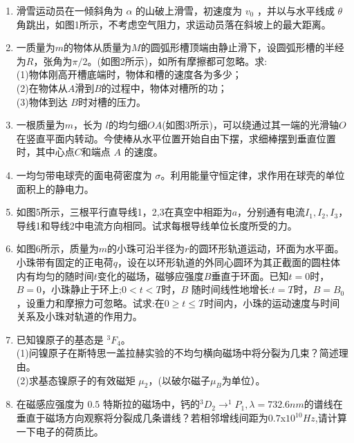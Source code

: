\begin{enumerate}
\item 滑雪运动员在一倾斜角为 $\alpha$ 的山破上滑雪，初速度为 $v_0$ ，并以与水平线成 $\theta$ 角跳出，如图1所示，不考虑空气阻力，求运动员落在斜坡上的最大距离。
\item 一质量为$m$的物体从质量为$M$的圆弧形槽顶端由静止滑下，设圆弧形槽的半经为$R$，张角为$\pi /2$。(如图2所示)，如所有摩擦都可忽略。求:\\
(1)物体刚高开槽底端时，物体和槽的速度各为多少；\\
(2)在物体从$A$滑到$B$的过程中，物体对槽所的功；\\
(3)物体到达 $B $时对槽的压力。
\item 一根质量为$m$，长为  $l$的均匀细$OA$(如图3所示)，可以绕通过其一端的光滑轴$O$在竖直平面内转动。今使棒从水平位置开始自由下摆，求细棒摆到垂直位置时，其中心点$C$和端点 $A$ 的速度。
\item 一均匀带电球壳的面电荷密度为 $\sigma$。利用能量守恒定律，求作用在球壳的单位面积上的静电力。
\item 如图5所示，三根平行直导线1，2,3在真空中相距为$a$，分别通有电流$I_1,I_2,I_3$，导线1和导线2中电流方向相同。试求每根导线单位长度所受的力。
\item 如图6所示，质量为$m$的小珠可沿半径为$r$的圆环形轨道运动，环面为水平面。小珠带有固定的正电荷$q$，设在以环形轨道的外同心圆环为其正截面的圆柱体内有均匀的随时间$t$变化的磁场，磁够应强度$B$垂直于环面。已知$t=0$时，$B=0$，小珠静止于环上;$0<t<T$时，$B$ 随时间线性地增长:$t=T$时，$B=B_0$，设重力和摩擦力可忽略。试求:在$0\ge t \le T$时间内，小珠的运动速度与时间关系及小珠对轨道的作用力。
\item 已知镍原子的基态是 $ ^{3}F_4$。\\
(1)问镍原子在斯特思一盖拉赫实验的不均匀横向磁场中将分裂为几束？简述理由。\\
(2)求基态镍原子的有效磁矩 $\mu_2$，(以破尔磁子$\mu_B$为单位）。
\item 在磁感应强度为 $0.5$ 特斯拉的磁场中，钙的$^{3}D_2 \to ^1 P_1  ,\lambda=732.6nm$的谱线在垂直于磁场方向观察将分裂成几条谱线？若相邻增线间距为$0.7$x$10^{10}Hz$,请计算一下电子的荷质比。
\end{enumerate}
